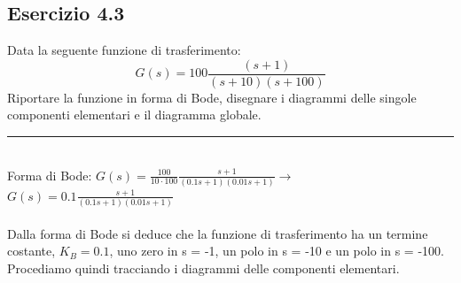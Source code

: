 \documentclass[12pt,a4paper]{article}
\begin{document}
	\subsection*{Esercizio 4.3} Data la seguente funzione di trasferimento:
	\[
	G(s) = 100\frac{(s+1)}{(s+10)(s+100)}
	\]
	Riportare la funzione in forma di Bode, disegnare i diagrammi delle singole componenti elementari e il diagramma globale.
	\par\noindent\rule{\textwidth}{0.4pt}
	\vspace{5mm}
	\\
	Forma di Bode: \quad$G(s) = \frac{100}{10 \cdot 100}\frac{s+1}{\left(0.1s+1\right)\left(0.01s+1\right)}$\quad$\rightarrow$\quad$G(s) = 0.1\frac{s+1}{\left(0.1s+1\right)\left(0.01s+1\right)}$\\\\
	Dalla forma di Bode si deduce che la funzione di trasferimento ha un termine costante, $K_B = 0.1$, uno zero in s = -1, un polo in s = -10 e un polo in s = -100.\\Procediamo quindi tracciando i diagrammi delle componenti elementari.\\
\end{document}
